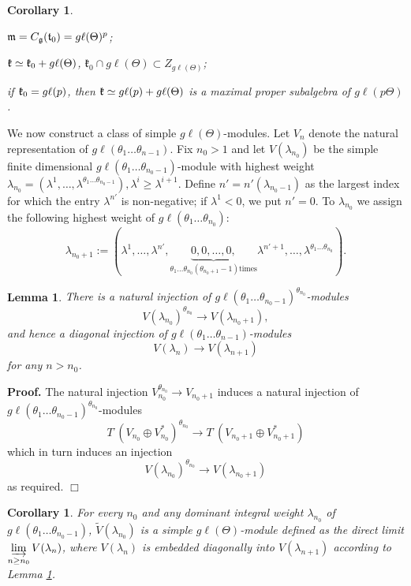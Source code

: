 \documentclass[12pt]{article}
\newcounter{theorem}
\newtheorem{lemma}[theo]{Lemma}
\newtheorem{corollary}[theo]{Corollary}
\newenvironment{proof}{ \textbf{Proof.}}{$\Box$}
\newcommand{\kk}{\mathfrak{k}}
\newcommand{\refle}[1]{Lemma \ref{#1}}
\newcommand{\gl}{{g\ell}}
\begin{document}
\begin{corollary}\label{cor32}
\item[(a)] $\frak m = {C}_{\frak g}(\frak t_0) = \gl(\Theta)^p$;
\item[(b)] $\frak k\simeq\frak k_0 + \gl (\Theta)$, $\kk_0\cap\gl(\Theta)\subset Z_{\gl(\Theta)}$;
\item[(c)] if $\frak k_0 = \gl (p)$, then $\frak k \simeq \gl (p)+\gl(\Theta)$ is a maximal proper subalgebra of $\gl (p\Theta )$.
\end{corollary}

We now construct a class of simple $\gl (\Theta)$-modules. Let $V_n$ denote the natural representation of $\gl(\theta_1\dots\theta_{n-1})$. Fix $n_0>1$ and let $V(\lambda_{n_{0}})$ be the simple finite dimensional $\gl (\theta_1\ldots\theta_{n_{0}-1})$-module with highest weight $\lambda_{n_{0}} = (\lambda^1,\ldots,\lambda^{\theta_{1}\ldots\theta_{n_{0}-1}}), \lambda^i\geq\lambda^{i+1}$.  Define $n' = n'(\lambda_{n_{0}-1})$ as the largest index for which the entry $\lambda^{n'}$ is non-negative; if $\lambda^1 < 0$, we put $n' = 0$. To $\lambda_{n_{0}}$ we assign the following highest weight of $\gl (\theta_1\ldots\theta_{n_{0}})$:
$$
\lambda_{n_{0}+1} := (\lambda^1,\ldots ,\lambda^{n'},\underbrace{0,0,\ldots,0,}_{\theta_1\ldots\theta_{n_{0}}(\theta_{n_{0}+1}-1)\text{times}} \lambda^{n'+1},\ldots,\lambda^{\theta_{1}\ldots\theta_{n_{0}}}).
$$

\begin{lemma}\label{le33} There is a natural injection of $\gl(\theta_1\ldots\theta_{n_{0}-1})^{\theta_{n_{0}}}$-modules
$$
V(\lambda_{n_{0}})^{\theta_{n_{0}}} \to  V(\lambda_{n_{0}+1}),
$$
and hence a diagonal injection of $\gl (\theta_1\ldots\theta_{n-1})$-modules
$$
V(\lambda_n)\to V(\lambda_{n+1})
$$
for any $n>n_0$.
\end{lemma}
\begin{proof}  The natural injection $V_{n_{0}}^{\theta_{n_{0}}}\to V_{n_{0}+1}$ induces a natural injection of $\gl(\theta_1\ldots\theta_{n_{0}-1})^{\theta_{n_{0}}}$-modules
$$
T^\cdot(V_{n_{0}}\oplus V^*_{n_{0}})^{\theta_{n_{0}}}\to T^\cdot(V_{n_{0}+1}\oplus V^*_{n_{0}+1})
$$
which in turn induces an injection
$$
V(\lambda_{n_{0}})^{\theta_{n_{0}}}\to V(\lambda_{n_{0}+1})
$$
as required.
\end{proof}

\begin{corollary}\label{cor34} For every $n_0$ and any dominant integral weight $\lambda_{n_{0}}$ of $\gl (\theta_1\ldots\theta_{n_{0}-1})$, $\tilde V(\lambda_{n_{0}})$ is a simple $\gl (\Theta)$-module defined as the direct limit $\varinjlim\limits_{n\geq n_{0}} V(\lambda_n)$, where $V(\lambda_n)$ is embedded diagonally into $V(\lambda_{n+1})$ according to \refle{le33}.
\end{corollary}
\end{document}
